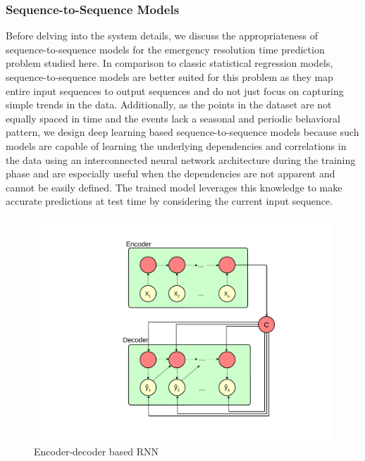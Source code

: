 \subsubsection{Sequence-to-Sequence Models}
Before delving into the system details, we discuss the appropriateness of sequence-to-sequence models for the emergency resolution time prediction problem studied here. In comparison to classic statistical regression models, sequence-to-sequence models are  better suited for this problem  as they map entire input sequences to output sequences and do not just  focus on capturing simple trends in the data. Additionally, as the points in the dataset are not  equally spaced in time and the events lack a seasonal and periodic behavioral pattern, we design deep learning based sequence-to-sequence models because such models are capable of learning the underlying dependencies and correlations in the data using an interconnected neural network architecture during the training phase and are especially useful when the dependencies are not apparent and cannot be easily defined. The trained model  leverages this knowledge to make accurate predictions at test time by considering the current input sequence.


\begin{figure}[!ht]
    \centering
       \includegraphics[trim=80 50 10 50,clip,width=1.0\linewidth]{Figures/Model/RNN}
       \caption{Encoder-decoder based RNN}
  \label{fig:RNN} 
\vspace{-3mm}
\end{figure}


